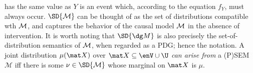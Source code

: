 has the same value as $Y$ is an event
which, according to the equation $f_Y$,
must always occur.
%
$\SD{\cal M}$ can be thought of as the set of distributions compatible
wth $\cal M$, and captures the behavior of the causal model $\cal M$ in
the absence of intervention.  
It is worth noting that $\SD{\dg M}$ is also
precisely the set-of-distribution semantics of $\cal M$, when regarded as a PDG;
    hence the notation.
A joint distribution $\mu(\mat X)$ over $\mat X \subseteq \enV \cup \U$ \emph{can arise from} a (P)SEM $\mathcal M$ iff there 
is
some $\nu \in \SD{\mathcal M}$ whose marginal on $\mat X$ is $\mu$.



